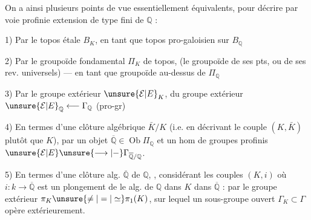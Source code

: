 On a ainsi plusieurs points de vue essentiellement équivalents, pour décrire par voie profinie  extension  de type fini de $\mathbb Q$ :

1) Par le topos étale $B_K$, en tant que topos pro-galoisien sur $B_{\mathbb Q}$

2) Par le groupoïde fondamental $\Pi_K$ de  topos, (le groupoïde de ses pts, ou de ses rev. universels) --- en tant que groupoïde au-dessus de $\Pi_{\mathbb Q}$

 3) Par le groupe extérieur $\unsure{\mathcal E|E}_K$,  du groupe extérieur $\unsure{\mathcal E|E}_{\mathbb Q}\longleftarrow\Gamma_{\mathbb Q}$ (pro-gr)

4) En termes d'une clôture algébrique $\bar K/K$ (i.e. en décrivant le couple $(K,\bar K)$ plutôt que $K$), par un objet $\overline{\mathbb Q}\in\operatorname{Ob}\Pi_{\mathbb Q}$\unsure{,|)} et un hom de groupes profinis $\unsure{\mathcal E|E}\unsure{\longrightarrow|-}\Gamma_{\overline{\mathbb Q}/\mathbb Q}$.

5) En termes d'une clôture alg.  $\overline{\mathbb Q}$ de $\mathbb Q$, ,  considérant les couples $(K,i)$ où $i:k\longrightarrow\overline{\mathbb Q}$ est un plongement de le  alg. de $\mathbb Q$ dans $K$ dans $\overline{\mathbb Q}$ :  par le groupe extérieur $\pi_K\unsure{\neq|=|\simeq}\pi_1(K)$, sur lequel un sous-groupe ouvert $\Gamma_K\subset\Gamma$ opère extérieurement.

